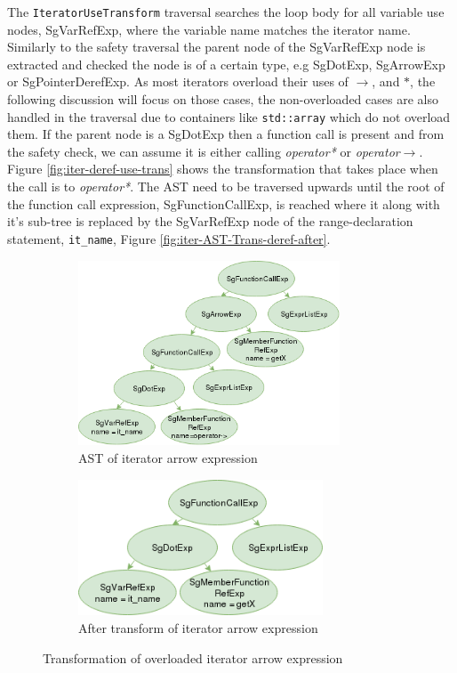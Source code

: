 \documentclass[bsc,frontabs,singlespacing,twoside,parskip,deptreport]{infthesis}
\begin{document}
The \texttt{IteratorUseTransform} traversal searches the loop body for all variable use nodes, SgVarRefExp, where the variable name matches the iterator name. Similarly to the safety traversal the parent node of the SgVarRefExp node is extracted and checked the node is of a certain type, e.g SgDotExp, SgArrowExp or SgPointerDerefExp. As most iterators overload their uses of $\rightarrow$, and $*$, the following discussion will focus on those cases, the non-overloaded cases are also handled in the traversal due to containers like \texttt{std::array} which do not overload them. If the parent node is a SgDotExp then a function call is present and from the safety check, we can assume it is either calling \textit{operator*} or \textit{operator$\rightarrow$}. Figure \ref{fig:iter-deref-use-trans} shows the transformation that takes place when the call is to \textit{operator*}. The AST need to be traversed upwards until the root of the function call expression, SgFunctionCallExp, is reached where it along with it's sub-tree is replaced by the SgVarRefExp node of the range-declaration statement, \texttt{it\_name}, Figure \ref{fig:iter-AST-Trans-deref-after}. 

\begin{figure}[H]
    \begin{subfigure}[b]{0.5\textwidth}
        \centering
            \includegraphics[height=5.5cm]{images/iterator-arrow-replace-ast.png}
        \caption{AST of iterator arrow expression}
        \label{fig:iter-AST-Trans-arrow-before}
    \end{subfigure}
    \hfill
    \begin{subfigure}[b]{0.5\textwidth}
        \centering
            \includegraphics[width=0.8\textwidth]{images/iterator-arrow-replace-ast-after.png}
        \caption{After transform of iterator arrow expression}
        \label{fig:iter-AST-Trans-arrow-after}
    \end{subfigure}
    \vspace{-0.5cm}
    \caption{Transformation of overloaded iterator arrow expression}
    \label{fig:iter-arrow-use-trans}
\end{figure}
\end{document}
